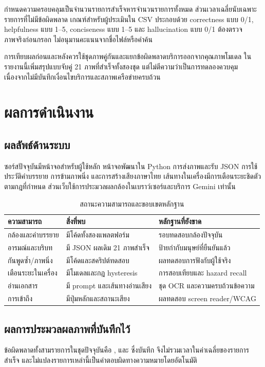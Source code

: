 กำหนดความครอบคลุมเป็นจำนวนรายการสำเร็จหารจำนวนรายการทั้งหมด ส่วนเวลาเฉลี่ยนับเฉพาะรายการที่ไม่มีข้อผิดพลาด เกณฑ์สำหรับผู้ประเมินใน CSV ประกอบด้วย correctness แบบ 0/1, helpfulness แบบ 1--5, conciseness แบบ 1--5 และ hallucination แบบ 0/1 ต้องตรวจภาพจริงก่อนกรอก ไม่อนุมานคะแนนจากชื่อไฟล์หรือคำค้น

การเทียบผลก่อนและหลังควรใช้ชุดภาพคู่กันและแยกข้อผิดพลาดบริการออกจากคุณภาพโมเดล ในรายงานนี้เพิ่มสรุปแบบจับคู่ 21 ภาพที่สำเร็จทั้งสองชุด แต่ไม่ตีความว่าเป็นการทดลองควบคุม เนื่องจากไม่มีบันทึกเงื่อนไขบริการและสภาพเครือข่ายครบถ้วน

\chapter{ผลการดำเนินงาน}
\section{ผลลัพธ์ด้านระบบ}
ซอร์สปัจจุบันมีหน้าจอสำหรับผู้ใช้หลัก หน้าจอพัฒนาใน Python การส่งภาพและรับ JSON การใช้ประวัติคำบรรยาย การข้ามภาพนิ่ง และการสร้างเสียงภาษาไทย เส้นทางในเครื่องมีการเตือนระยะชิดตัวตามกฎที่กำหนด ส่วนเว็บใช้การประมวลผลกล้องในเบราว์เซอร์และบริการ Gemini เท่านั้น

\begin{table}[H]\centering\caption{สถานะความสามารถและขอบเขตหลักฐาน}
\begin{tabularx}{\linewidth}{p{39mm}YY}\toprule ความสามารถ & สิ่งที่พบ & หลักฐานที่ยังขาด\\\midrule
กล้องและคำบรรยาย & มีโค้ดทั้งสองแพลตฟอร์ม & รอบทดสอบกล้องปัจจุบัน\\
อารมณ์และบริบท & มี JSON ผลเดิม 21 ภาพสำเร็จ & ป้ายกำกับมนุษย์ที่ยืนยันแล้ว\\
กันพูดซ้ำ/ภาพนิ่ง & มีโค้ดและสคริปต์ทดสอบ & ผลทดสอบการฟังกับผู้ใช้จริง\\
เตือนระยะในเครื่อง & มีโมเดลและกฎ hysteresis & การสอบเทียบและ hazard recall\\
อ่านเอกสาร & มี prompt และเส้นทางอ่านเสียง & ชุด OCR และความครบถ้วนข้อความ\\
การเข้าถึง & มีปุ่มหลักและสถานะเสียง & ผลทดสอบ screen reader/WCAG\\\bottomrule
\end{tabularx}\end{table}

\section{ผลการประมวลผลภาพที่บันทึกไว้}


ข้อผิดพลาดทั้งสามรายการในชุดปัจจุบันคือ ,  และ  ซึ่งบันทึก  จึงไม่รวมเวลาในค่าเฉลี่ยของรายการสำเร็จ และไม่แปลงรายการเหล่านี้เป็นคำตอบผิดทางความหมายโดยอัตโนมัติ

